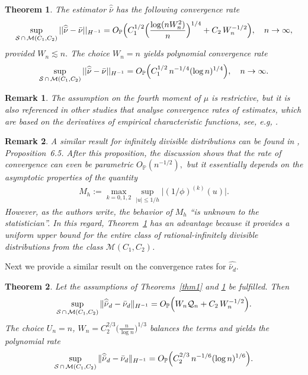 \documentclass[numbers,webpdf,imaiai]{ima-authoring-template}%
\theoremstyle{thmstyletwo}%
\newtheorem{theorem}{Theorem}%
\newtheorem{remark}{Remark}%
\renewcommand{\P}{\mathbb{P}}
\newcommand{\mQ}{\mathcal{Q}}
\numberwithin{equation}{section}
\begin{document}
\begin{theorem}\label{thm3}
     The estimator $\widehat{\bar{\nu}}$ has the following convergence rate
    \begin{equation*}
        \sup_{\mathcal{S}\, \cap\, \mathcal{M}(C_1, C_2)} ||\widehat{\bar{\nu}} - \bar{\nu}||_{H^{-1}} = O_{\mathbb{P}}\Bigl(C_1^{1/2}\Bigl(\frac{\log (nW^2_n)}{n}\Bigr)^{1/4} + C_2\, W_n^{-1/2}\Bigr), \quad n \rightarrow \infty,
    \end{equation*}
    provided \(W_n \lesssim n.\) The choice $W_n = n$ yields polynomial convergence rate
    \begin{equation*}
        \sup_{\mathcal{S}\, \cap\, \mathcal{M}(C_1, C_2)}||\widehat{\bar{\nu}} - \bar{\nu}||_{H^{-1}} = O_{\mathbb{P}}\Bigl(C_1^{1/2}\,n^{-1/4}(\log n)^{1/4}\Bigr), \quad n \rightarrow \infty.
    \end{equation*}
\end{theorem}
\begin{remark}
The assumption on the fourth moment of $\mu$ 
is restrictive, but it is also referenced in other studies that analyse convergence rates of estimates, which are based on the derivatives of empirical characteristic functions, see, e.g, \citep{NeumannReiss2009}. 
\end{remark}
\begin{remark}
A similar result for infinitely divisible distributions can be found in \citep{BR2015}, Proposition~6.5. After this proposition, the discussion shows that the rate of convergence can even be  parametric \(O_{\P}(n^{-1/2}),\) but it essentially depends on the asymptotic properties of the quantity 
\begin{align*}
M_h := \max_{k=0,1,2} \sup_{|u| \leq 1/h} \bigl| 
(1/\phi)^{(k)}(u)\bigr|.
\end{align*}
However, as the authors write, the behavior of \(M_h\) ``is unknown to the statistician''. In this regard, Theorem~\ref{thm3} has an advantage because it provides a uniform upper bound for the entire class of rational-infinitely divisible distributions from the class \(\mathcal{M}(C_1, C_2)\).  
\end{remark} 

Next we provide a similar result on the convergence rates for $\widehat{\bar\nu_d}.$

\begin{theorem}\label{thm4}
Let the assumptions of Theorems~\ref{thm1} and  \ref{thm3} be fulfilled. Then 
\[
\sup_{\mathcal{S}\,\cap\,\mathcal{M}(C_1,C_2)}\|\widehat{\bar\nu}_d-\bar\nu_d\|_{H^{-1}}
= O_\P\Bigl( W_n \mQ_n + C_2\, W_n^{-1/2}\Bigr).
\]
The choice $U_n = n$, $W_n = C_2^{2/3}\bigl(\tfrac{n}{\log n}\bigr)^{1/3}$ balances the terms and  yields the polynomial rate
\[
\sup_{\mathcal{S}\,\cap\,\mathcal{M}(C_1,C_2)}\|\widehat{\bar\nu}_d-\bar\nu_d\|_{H^{-1}}
= O_\P\Bigl( C_2^{2/3}\, n^{-1/6}(\log n)^{1/6}\Bigr).
\]
\end{theorem}
\end{document}
